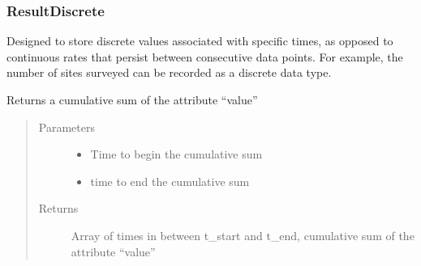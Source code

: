 \documentclass[letterpaper,10pt,english]{sphinxmanual}
\begin{document}
\subsubsection{ResultDiscrete}
\label{\detokenize{index:resultdiscrete}}

\begin{fulllineitems}
\label{\detokenize{index:feast.EmissionSimModules.result_classes.ResultDiscrete}}
Designed to store discrete values associated with specific times, as opposed to continuous rates that persist
between consecutive data points. For example, the number of sites surveyed can be recorded as a discrete data type.

\begin{fulllineitems}
\label{\detokenize{index:feast.EmissionSimModules.result_classes.ResultDiscrete.get_cumulative_vals}}
Returns a cumulative sum of the attribute “value”
\begin{quote}\begin{description}
\item[{Parameters}] \leavevmode\begin{itemize}
\item {} 
 \textendash{} Time to begin the cumulative sum

\item {} 
 \textendash{} time to end the cumulative sum

\end{itemize}

\item[{Returns}] \leavevmode
Array of times in between t\_start and t\_end, cumulative sum of the attribute “value”

\end{description}\end{quote}


\end{fulllineitems}
\end{fulllineitems}
\end{document}
